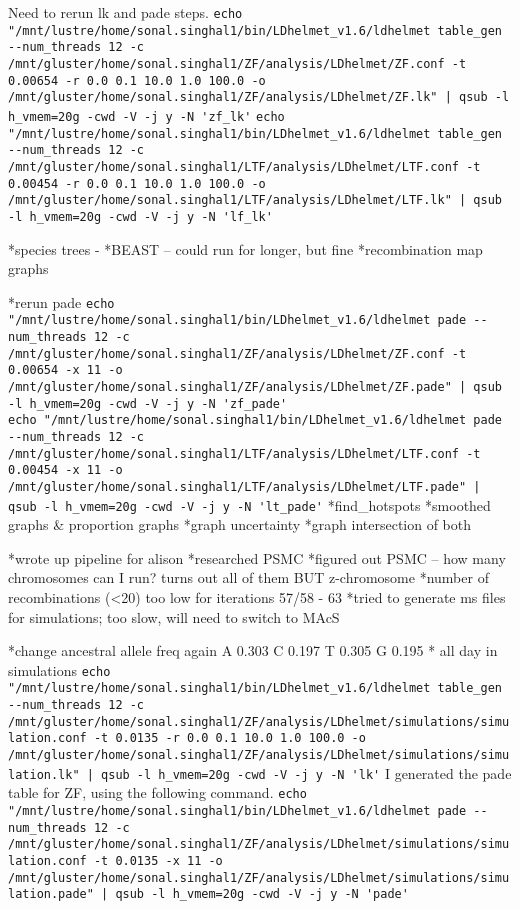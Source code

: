 \documentclass[idxtotoc,hyperref,openany,oneside]{labbook} %
\begin{document}
Need to rerun lk and pade steps.
\verb+echo "/mnt/lustre/home/sonal.singhal1/bin/LDhelmet_v1.6/ldhelmet table_gen --num_threads 12 -c /mnt/gluster/home/sonal.singhal1/ZF/analysis/LDhelmet/ZF.conf -t 0.00654 -r 0.0 0.1 10.0 1.0 100.0 -o /mnt/gluster/home/sonal.singhal1/ZF/analysis/LDhelmet/ZF.lk" | qsub -l h_vmem=20g -cwd -V -j y -N 'zf_lk'+
\verb+echo "/mnt/lustre/home/sonal.singhal1/bin/LDhelmet_v1.6/ldhelmet table_gen --num_threads 12 -c /mnt/gluster/home/sonal.singhal1/LTF/analysis/LDhelmet/LTF.conf -t 0.00454 -r 0.0 0.1 10.0 1.0 100.0 -o /mnt/gluster/home/sonal.singhal1/LTF/analysis/LDhelmet/LTF.lk" | qsub -l h_vmem=20g -cwd -V -j y -N 'lf_lk'+

*species trees - *BEAST -- could run for longer, but fine
*recombination map graphs

*rerun pade
\verb+echo "/mnt/lustre/home/sonal.singhal1/bin/LDhelmet_v1.6/ldhelmet pade --num_threads 12 -c /mnt/gluster/home/sonal.singhal1/ZF/analysis/LDhelmet/ZF.conf -t 0.00654 -x 11 -o /mnt/gluster/home/sonal.singhal1/ZF/analysis/LDhelmet/ZF.pade" | qsub -l h_vmem=20g -cwd -V -j y -N 'zf_pade'+ \\
\verb+echo "/mnt/lustre/home/sonal.singhal1/bin/LDhelmet_v1.6/ldhelmet pade --num_threads 12 -c /mnt/gluster/home/sonal.singhal1/LTF/analysis/LDhelmet/LTF.conf -t 0.00454 -x 11 -o /mnt/gluster/home/sonal.singhal1/LTF/analysis/LDhelmet/LTF.pade" | qsub -l h_vmem=20g -cwd -V -j y -N 'lt_pade'+
*find_hotspots
*smoothed graphs & proportion graphs
*graph uncertainty 
*graph intersection of both

*wrote up pipeline for alison
*researched PSMC
*figured out PSMC -- how many chromosomes can I run? turns out all of them BUT z-chromosome
*number of recombinations (<20) too low for iterations 57/58 - 63
*tried to generate ms files for simulations; too slow, will need to switch to MAcS

*change ancestral allele freq again
A 0.303
C 0.197
T 0.305
G 0.195
* all day in simulations
\verb+echo "/mnt/lustre/home/sonal.singhal1/bin/LDhelmet_v1.6/ldhelmet table_gen --num_threads 12 -c /mnt/gluster/home/sonal.singhal1/ZF/analysis/LDhelmet/simulations/simulation.conf -t 0.0135 -r 0.0 0.1 10.0 1.0 100.0 -o /mnt/gluster/home/sonal.singhal1/ZF/analysis/LDhelmet/simulations/simulation.lk" | qsub -l h_vmem=20g -cwd -V -j y -N 'lk'+
I generated the pade table for ZF, using the following command.
\verb+echo "/mnt/lustre/home/sonal.singhal1/bin/LDhelmet_v1.6/ldhelmet pade --num_threads 12 -c /mnt/gluster/home/sonal.singhal1/ZF/analysis/LDhelmet/simulations/simulation.conf -t 0.0135 -x 11 -o /mnt/gluster/home/sonal.singhal1/ZF/analysis/LDhelmet/simulations/simulation.pade" | qsub -l h_vmem=20g -cwd -V -j y -N 'pade'+
\end{document}
